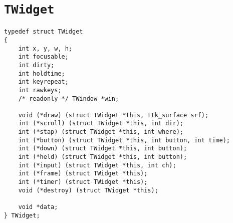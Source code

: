 \documentclass[12pt,letterpaper]{report}
\let\ttt\tt
\def\tt{\def\_{{\ttt\char`\_}}\ttt}
\def\texttt#1{{\tt #1}}
\begin{document}
\section{\texttt{TWidget}}
\begin{verbatim}
typedef struct TWidget
{
    int x, y, w, h;
    int focusable;
    int dirty;
    int holdtime;
    int keyrepeat;
    int rawkeys;
    /* readonly */ TWindow *win;
    
    void (*draw) (struct TWidget *this, ttk_surface srf);
    int (*scroll) (struct TWidget *this, int dir);
    int (*stap) (struct TWidget *this, int where);
    int (*button) (struct TWidget *this, int button, int time);
    int (*down) (struct TWidget *this, int button);
    int (*held) (struct TWidget *this, int button);
    int (*input) (struct TWidget *this, int ch);
    int (*frame) (struct TWidget *this);
    int (*timer) (struct TWidget *this);
    void (*destroy) (struct TWidget *this);

    void *data;
} TWidget;
\end{verbatim}
\vskip6pt\relax
\end{document}
